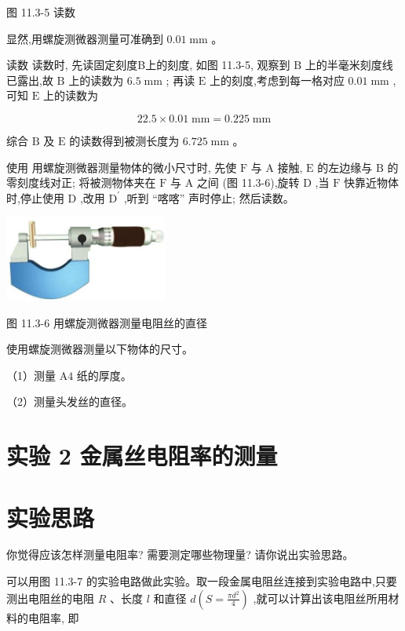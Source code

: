 \documentclass[10pt]{article}
\begin{document}
图 11.3-5 读数

显然,用螺旋测微器测量可准确到 \({0.01}\mathrm{\;{mm}}\) 。

读数 读数时, 先读固定刻度B上的刻度, 如图 11.3-5, 观察到 \(\mathrm{B}\) 上的半毫米刻度线已露出,故 \(\mathrm{B}\) 上的读数为 \({6.5}\mathrm{\;{mm}}\) ; 再读 \(\mathrm{E}\) 上的刻度,考虑到每一格对应 \({0.01}\mathrm{\;{mm}}\) , 可知 \(\mathrm{E}\) 上的读数为

\[
{22.5} \times {0.01}\mathrm{\;{mm}} = {0.225}\mathrm{\;{mm}}
\]

综合 \(\mathrm{B}\) 及 \(\mathrm{E}\) 的读数得到被测长度为 \({6.725}\mathrm{\;{mm}}\) 。

使用 用螺旋测微器测量物体的微小尺寸时, 先使 \(\mathrm{F}\) 与 \(\mathrm{A}\) 接触, \(\mathrm{E}\) 的左边缘与 \(\mathrm{B}\) 的零刻度线对正; 将被测物体夹在 \(\mathrm{F}\) 与 \(\mathrm{A}\) 之间 (图 11.3-6),旋转 \(\mathrm{D}\) ,当 \(\mathrm{F}\) 快靠近物体时,停止使用 \(\mathrm{D}\) ,改用 \({\mathrm{D}}^{\prime }\) ,听到 “喀喀” 声时停止; 然后读数。

\begin{center}
\includegraphics[max width=0.4\textwidth]{images/01911d5f-8e38-70c0-b5b8-2b399bd115b6_70_421855.jpg}
\end{center}

图 11.3-6 用螺旋测微器测量电阻丝的直径

使用螺旋测微器测量以下物体的尺寸。

（1）测量 \(\mathrm{A}4\) 纸的厚度。

（2）测量头发丝的直径。

\section*{实验 2 金属丝电阻率的测量}

\section*{实验思路}

你觉得应该怎样测量电阻率? 需要测定哪些物理量? 请你说出实验思路。

可以用图 11.3-7 的实验电路做此实验。取一段金属电阻丝连接到实验电路中,只要测出电阻丝的电阻 \(R\) 、长度 \(l\) 和直径 \(d\left( {S = \frac{\pi {d}^{2}}{4}}\right)\) ,就可以计算出该电阻丝所用材料的电阻率, 即
\end{document}
